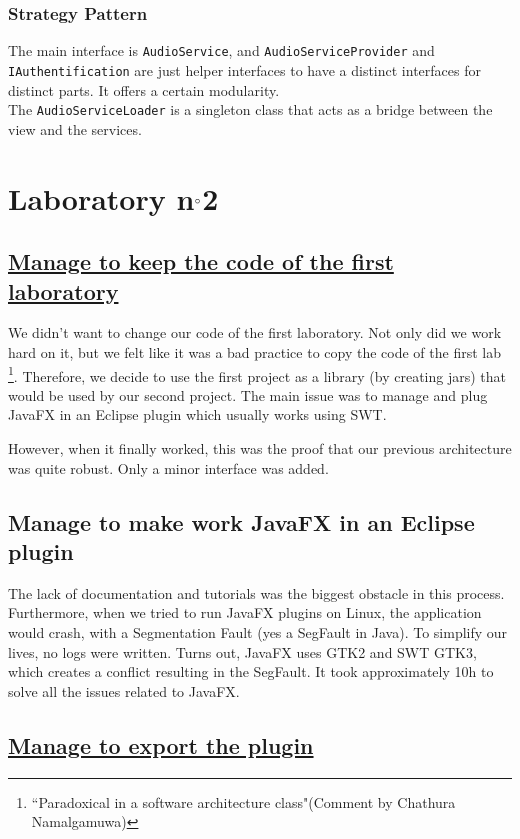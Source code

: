 \documentclass{report}
\begin{document}
\subsubsection{Strategy Pattern}
The main interface is \texttt{AudioService},  and \texttt{AudioServiceProvider} and \texttt{IAuthentification} are just helper interfaces to have a distinct interfaces for distinct parts. It offers a certain modularity. \\
The \texttt{AudioServiceLoader} is a singleton class that acts as a bridge between the view and the services. 

\section{Laboratory n$\degree$2}

\subsection{\href{https://31.media.tumblr.com/tumblr_m6ppniq7uX1r54kwx.gif}{Manage to keep the code of the first laboratory}}

We didn't want to change our code of the first laboratory. Not only did we work hard on it, but we felt like it was a bad practice to copy the code of the first lab \footnote{``Paradoxical in a software architecture class"(Comment by Chathura Namalgamuwa)}. Therefore, we decide to use the first project as a library (by creating jars) that would be used by our second project. The main issue was to manage and plug JavaFX in an Eclipse plugin which usually works using SWT.

However, when it finally worked, this was the proof that our previous architecture was quite robust. Only a minor interface was added.

\subsection{Manage to make work JavaFX in an Eclipse plugin}
\label{implem::long}
The lack of documentation and tutorials was the biggest obstacle in this process. Furthermore, when we tried to run JavaFX plugins on Linux, the application would crash, with a Segmentation Fault (yes a SegFault in Java). To simplify our lives, no logs were written. Turns out, JavaFX uses GTK2 and SWT GTK3, which creates a conflict resulting in the SegFault. It took approximately 10h to solve all the issues related to JavaFX.

\subsection{\href{http://truegif.com/pictures/gif/4461.gif}{Manage to export the plugin}}
\end{document}
